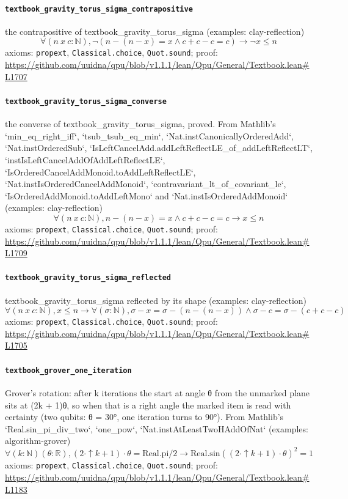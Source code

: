 \documentclass[11pt]{article}
\begin{document}
\paragraph{\texttt{textbook\_gravity\_torus\_sigma\_contrapositive}}
the contrapositive of textbook\_gravity\_torus\_sigma (examples: clay-reflection)
\[ \forall (n\ x\ c : \mathbb{N}), \neg (n - (n - x) = x \land c + c - c = c) \to \neg x \le n \]
\noindent axioms: \texttt{propext}, \texttt{Classical.choice}, \texttt{Quot.sound}; proof: \url{https://github.com/uuidna/qpu/blob/v1.1.1/lean/Qpu/General/Textbook.lean\#L1707}

\paragraph{\texttt{textbook\_gravity\_torus\_sigma\_converse}}
the converse of textbook\_gravity\_torus\_sigma, proved. From Mathlib's `min\_eq\_right\_iff`, `tsub\_tsub\_eq\_min`, `Nat.instCanonicallyOrderedAdd`, `Nat.instOrderedSub`, `IsLeftCancelAdd.addLeftReflectLE\_of\_addLeftReflectLT`, `instIsLeftCancelAddOfAddLeftReflectLE`, `IsOrderedCancelAddMonoid.toAddLeftReflectLE`, `Nat.instIsOrderedCancelAddMonoid`, `contravariant\_lt\_of\_covariant\_le`, `IsOrderedAddMonoid.toAddLeftMono` and `Nat.instIsOrderedAddMonoid` (examples: clay-reflection)
\[ \forall (n\ x\ c : \mathbb{N}), n - (n - x) = x \land c + c - c = c \to x \le n \]
\noindent axioms: \texttt{propext}, \texttt{Classical.choice}, \texttt{Quot.sound}; proof: \url{https://github.com/uuidna/qpu/blob/v1.1.1/lean/Qpu/General/Textbook.lean\#L1709}

\paragraph{\texttt{textbook\_gravity\_torus\_sigma\_reflected}}
textbook\_gravity\_torus\_sigma reflected by its shape (examples: clay-reflection)
\[ \forall (n\ x\ c : \mathbb{N}), x \le n \to \forall (\sigma : \mathbb{N}), \sigma - x = \sigma - (n - (n - x)) \land \sigma - c = \sigma - (c + c - c) \]
\noindent axioms: \texttt{propext}, \texttt{Classical.choice}, \texttt{Quot.sound}; proof: \url{https://github.com/uuidna/qpu/blob/v1.1.1/lean/Qpu/General/Textbook.lean\#L1705}

\paragraph{\texttt{textbook\_grover\_one\_iteration}}
Grover's rotation: after k iterations the start at angle θ from the unmarked plane sits at (2k + 1)θ, so when that is a right angle the marked item is read with certainty (two qubits: θ = 30°, one iteration turns to 90°). From Mathlib's `Real.sin\_pi\_div\_two`, `one\_pow`, `Nat.instAtLeastTwoHAddOfNat` (examples: algorithm-grover)
\[ \forall (k : \mathbb{N}) (\theta : \mathbb{R}), (2 \cdot \uparrow k + 1) \cdot \theta = \mathrm{Real.pi} / 2 \to \mathrm{Real.sin} ((2 \cdot \uparrow k + 1) \cdot \theta ) ^{2} = 1 \]
\noindent axioms: \texttt{propext}, \texttt{Classical.choice}, \texttt{Quot.sound}; proof: \url{https://github.com/uuidna/qpu/blob/v1.1.1/lean/Qpu/General/Textbook.lean\#L1183}
\end{document}
